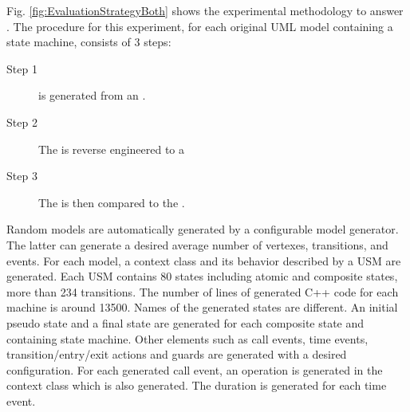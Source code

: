 Fig. \ref{fig:EvaluationStrategyBoth} shows the experimental methodology to answer . 
The procedure for this experiment, for each original UML model containing a state machine, consists of 3 steps: 
\begin{description}
	\item[Step 1]  is generated from an .
	
	\item[Step 2] The  is reverse engineered to a 
	
	\item[Step 3] The  is then compared to the .
\end{description}


Random models are automatically generated by a configurable model generator. 
The latter can generate a desired average number of vertexes, transitions, and events. 
For each model, a context class and its behavior described by a USM are generated. 
Each USM contains 80 states including atomic and composite states, more than 234 transitions. 
The number of lines of generated C++ code for each machine is around 13500. Names of the generated states are different. 
An initial pseudo state and a final state are generated for each composite state and containing state machine. 
Other elements such as call events, time events, transition/entry/exit actions and guards are generated with a desired configuration. 
For each generated call event, an operation is generated in the context class which is also generated. 
The duration is generated for each time event. 

